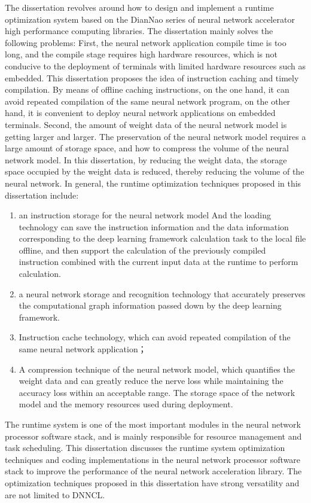 \begin{enabstract}
  The dissertation revolves around how to design and implement a runtime optimization system based on the DianNao series of neural network accelerator high performance computing libraries. The dissertation mainly solves the following problems: First, the neural network application compile time is too long, and the compile stage requires high hardware resources, which is not conducive to the deployment of terminals with limited hardware resources such as embedded. This dissertation proposes the idea of ​​instruction caching and timely compilation. By means of offline caching instructions, on the one hand, it can avoid repeated compilation of the same neural network program, on the other hand, it is convenient to deploy neural network applications on embedded terminals. Second, the amount of weight data of the neural network model is getting larger and larger. The preservation of the neural network model requires a large amount of storage space, and how to compress the volume of the neural network model. In this dissertation, by reducing the weight data, the storage space occupied by the weight data is reduced, thereby reducing the volume of the neural network. In general, the runtime optimization techniques proposed in this dissertation include: 
\begin{enumerate}
  \item an instruction storage for the neural network model And the loading technology can save the instruction information and the data information corresponding to the deep learning framework calculation task to the local file offline, and then support the calculation of the previously compiled instruction combined with the current input data at the runtime to perform calculation.
  \item a neural network storage and recognition technology that accurately preserves the computational graph information passed down by the deep learning framework.
  \item Instruction cache technology, which can avoid repeated compilation of the same neural network application；
  \item A compression technique of the neural network model, which quantifies the weight data and can greatly reduce the nerve loss while maintaining the accuracy loss within an acceptable range. The storage space of the network model and the memory resources used during deployment.
\end{enumerate}
  
  The runtime system is one of the most important modules in the neural network processor software stack, and is mainly responsible for resource management and task scheduling. This dissertation discusses the runtime system optimization techniques and coding implementations in the neural network processor software stack to improve the performance of the neural network acceleration library. The optimization techniques proposed in this dissertation have strong versatility and are not limited to DNNCL.

\end{enabstract}
